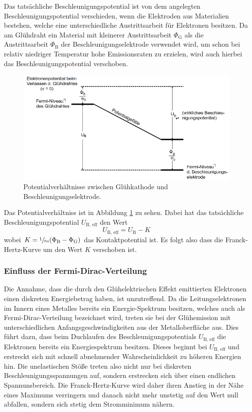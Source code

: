 Das tatsächliche Beschleunigungspotential ist von dem angelegten Beschleunigungspotential
verschieden, wenn die Elektroden aus Materialien bestehen, welche eine unterschiedliche Austrittsarbeit für Elektronen besitzen.
Da am Glühdraht ein Material mit kleinerer Austrittsarbeit $\Phi_\text{G}$ als die Austrittsarbeit $\Phi_\text{B}$ der Beschleunigungselektrode verwendet wird, um schon bei relativ niedriger Temperatur hohe Emissionsraten zu erzielen, wird auch hierbei
das Beschleunigungspotential verschoben. 
\begin{figure}
    \centering
    \caption{Potentialverhältnisse zwischen Glühkathode und Beschleunigungselektrode.\cite{v601}}
    \label{fig:verh}
    \includegraphics[width = 0.6 \textwidth]{pics/potdif.png}
\end{figure}
Das Potentialverhältniss ist in Abbildung \ref{fig:verh} zu sehen. Dabei hat das tatsächliche Beschleunigungspotential $U_\text{B, eff}$ den Wert
\begin{equation}
    U_\text{B, eff}= U_\text{B} - K
\end{equation}
wobei $K = \sfrac{1}{e_0} (\Phi_\text{B}-\Phi_\text{G})$ das Kontaktpotential ist. Es folgt also dass die Franck-Hertz-Kurve um den Wert $K$ verschoben ist.

\subsubsection{Einfluss der Fermi-Dirac-Verteilung}

Die Annahme, dass die durch den Glühelektrischen Effekt emittierten Elektronen einen diskreten Energiebetrag haben, ist unzutreffend.
Da die Leitungselektronen im Innern eines Metalles bereits ein Energie-Spektrum besitzen, welches auch als Fermi-Dirac-Verteilung bezeichnet wird, treten sie bei der
Glühemission mit unterschiedlichen Anfangsgeschwindigkeiten aus der Metalloberfläche aus. Dies führt dazu, dass beim Duchlaufen des Beschleunigungspotentials $U_\text{B, eff}$ die Elektronen
bereits ein Energiespektrum besitzen. Dieses beginnt bei $U_\text{B, eff}$ und erstreckt sich mit schnell abnehmender Wahrscheinlichkeit zu höheren Energien hin. 
Die unelastischen Stöße treten also nicht nur bei diskreten Beschleunigungsspannungen auf, sondern erstrecken sich über einen endlichen Spannunsbereich. 
Die Franck-Hertz-Kurve wird daher ihren Anstieg in der Nähe eines Maximums verringern und danach nicht mehr unstetig auf den Wert null abfallen, sondern sich stetig dem
Stromminimum nähern. 

